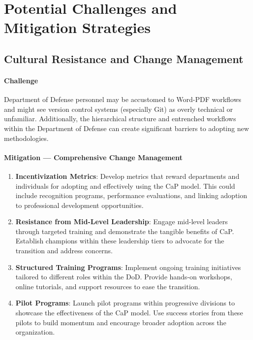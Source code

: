\documentclass[11pt]{article}
\begin{document}
	\section{Potential Challenges and Mitigation Strategies}

	\subsection{Cultural Resistance and Change Management}
	\paragraph{Challenge}
	Department of Defense personnel may be accustomed to Word-PDF workflows and might see version control systems (especially Git) as overly technical or unfamiliar. Additionally, the hierarchical structure and entrenched workflows within the Department of Defense can create significant barriers to adopting new methodologies.

	\paragraph{Mitigation --- Comprehensive Change Management}
	\begin{enumerate}
		\item \textbf{Incentivization Metrics}: Develop metrics that reward departments and individuals for adopting and effectively using the CaP model. This could include recognition programs, performance evaluations, and linking adoption to professional development opportunities.
		\item \textbf{Resistance from Mid-Level Leadership}: Engage mid-level leaders through targeted training and demonstrate the tangible benefits of CaP. Establish champions within these leadership tiers to advocate for the transition and address concerns.
		\item \textbf{Structured Training Programs}: Implement ongoing training initiatives tailored to different roles within the DoD. Provide hands-on workshops, online tutorials, and support resources to ease the transition.
		\item \textbf{Pilot Programs}: Launch pilot programs within progressive divisions to showcase the effectiveness of the CaP model. Use success stories from these pilots to build momentum and encourage broader adoption across the organization.
	\end{enumerate}
\end{document}
